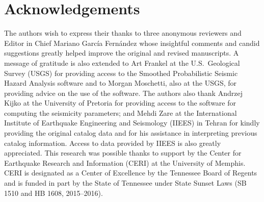 \section{Acknowledgements}

The authors wish to express their thanks to three anonymous reviewers and Editor in Chief Mariano Garc\'{i}a Fern\'{a}ndez whose insightful comments and candid suggestions greatly helped improve the original and revised manuscripts. A message of gratitude is also extended to Art Fran\-kel at the U.S.~Geological Survey (USGS) for providing access to the Smoothed Probabilistic Seismic Hazard Analysis software and to Morgan Moschetti, also at the USGS, for providing advice on the use of the software. The authors also thank Andrzej Kijko at the University of Pretoria for providing access to the software for computing the seismicity parameters; and Mehdi Zare at the International Institute of Earthquake Engineering and Seismology (IIEES) in Tehran for kindly providing the original catalog data and for his assistance in interpreting previous catalog information. Access to data provided by IIEES is also greatly appreciated. This research was possible thanks to support by the Center for Earthquake Research and Information (CERI) at the University of Memphis. CERI is designated as a Center of Excellence by the Tennessee Board of Regents and is funded in part by the State of Tennessee under State Sunset Laws (SB 1510 and HB 1608, 2015--2016).
